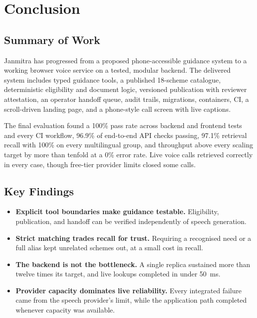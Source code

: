 \documentclass[11pt,a4paper,oneside]{report}
\begin{document}
\chapter{Conclusion}

\section{Summary of Work}
Janmitra has progressed from a proposed phone-accessible guidance system to a
working browser voice service on a tested, modular backend. The delivered system
includes typed guidance tools, a published 18-scheme catalogue, deterministic
eligibility and document logic, versioned publication with reviewer attestation,
an operator handoff queue, audit trails, migrations, containers, CI, a
scroll-driven landing page, and a phone-style call screen with live captions.

The final evaluation found a 100\% pass rate across backend and frontend tests
and every CI workflow,
96.9\% of end-to-end API checks passing, 97.1\% retrieval recall with 100\% on
every multilingual group, and throughput above every scaling target by more than
tenfold at a 0\% error rate. Live voice calls retrieved correctly in every case,
though free-tier provider limits closed some calls.

\section{Key Findings}
\begin{itemize}
  \item \textbf{Explicit tool boundaries make guidance testable.} Eligibility,
    publication, and handoff can be verified independently of speech generation.
  \item \textbf{Strict matching trades recall for trust.} Requiring a recognised
    need or a full alias kept unrelated schemes out, at a small cost in recall.
  \item \textbf{The backend is not the bottleneck.} A single replica sustained more
    than twelve times its target, and live lookups completed in under 50~ms.
  \item \textbf{Provider capacity dominates live reliability.} Every integrated
    failure came from the speech provider's limit, while the application path
    completed whenever capacity was available.
\end{itemize}
\end{document}

